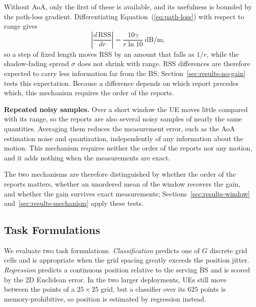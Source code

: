 Without AoA, only the first of these is available, and its usefulness is bounded by the path-loss gradient. Differentiating Equation~(\ref{eq:path-loss}) with respect to range gives
\begin{equation}
  \left\lvert \frac{d\,\mathrm{RSS}}{dr} \right\rvert = \frac{10\gamma}{r \ln 10}\ \text{dB/m},
  \label{eq:rss-gradient}
\end{equation}
so a step of fixed length moves RSS by an amount that falls as $1/r$, while the shadow-fading spread $\sigma$ does not shrink with range. RSS differences are therefore expected to carry less information far from the BS; Section~\ref{sec:results-no-gain} tests this expectation. Because a difference depends on which report precedes which, this mechanism requires the order of the reports.

\noindent\textbf{Repeated noisy samples.} Over a short window the UE moves little compared with its range, so the reports are also several noisy samples of nearly the same quantities. Averaging them reduces the measurement error, such as the AoA estimation noise and quantization, independently of any information about the motion. This mechanism requires neither the order of the reports nor any motion, and it adds nothing when the measurements are exact.

The two mechanisms are therefore distinguished by whether the order of the reports matters, whether an unordered mean of the window recovers the gain, and whether the gain survives exact measurements; Sections~\ref{sec:results-window} and~\ref{sec:results-mechanism} apply these tests.

\subsection{Task Formulations}
\label{subsec:task-formulations}

We evaluate two task formulations. \emph{Classification} predicts one of $G$ discrete grid cells and is appropriate when the grid spacing greatly exceeds the position jitter. \emph{Regression} predicts a continuous position relative to the serving BS and is scored by the 2D Euclidean error. In the two larger deployments, UEs still move between the points of a $25\times25$ grid, but a classifier over its $625$ points is memory-prohibitive, so position is estimated by regression instead.
